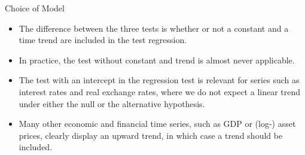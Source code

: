 \begin{frame}{Choice of Model}
\begin{itemize}
\item The difference between the three tests is whether or not a constant and a time trend are included in the test regression.
\item In practice, the test without constant and trend  is
almost never applicable.

\item The test with an intercept in the regression test is relevant for series such
as interest
rates and real exchange rates, where we do not expect a linear trend under
either the null or the alternative hypothesis.

\item Many other economic and
financial time series, such as GDP or (log-)
asset prices, clearly display an upward trend, in which case a trend should be included.
\end{itemize}
\end{frame}

